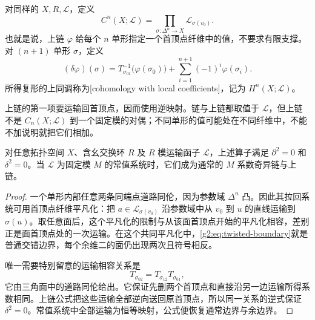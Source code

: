 \begin{definition}[局部系数奇异上链]\label{g2:def:twisted-cochains}
	对同样的 \(X,R,\mathcal L\)，定义
	\[
		C^n(X;\mathcal L)=\prod_{\sigma:\Delta^n\to X}\mathcal L_{\sigma(v_0)}.
	\]
	也就是说，上链 \(\varphi\) 给每个 \(n\) 单形指定一个首顶点纤维中的值，不要求有限支撑。对 \((n+1)\) 单形 \(\sigma\)，定义
	\begin{equation}\label{g2:eq:twisted-coboundary}
		(\delta\varphi)(\sigma)=T_{\sigma_{01}}^{-1}\bigl(\varphi(\sigma_0)\bigr)+\sum_{i=1}^{n+1}(-1)^i\varphi(\sigma_i).
	\end{equation}
	所得复形的上同调称为[cohomology with local coefficients]，记为 \(H^n(X;\mathcal L)\)。
\end{definition}

上链的第一项要运输回首顶点，因而使用逆映射。链与上链都取值于 \(\mathcal L\)，但上链不是 \(C_n(X;\mathcal L)\) 到一个固定模的对偶；不同单形的值可能处在不同纤维中，不能不加说明就把它们相加。

\begin{proposition}\label{g2:prop:twisted-boundary-square}
	对任意拓扑空间 \(X\)、含幺交换环 \(R\) 及 \(R\) 模运输函子 \(\mathcal L\)，上述算子满足 \(\partial^2=0\) 和 \(\delta^2=0\)。当 \(\mathcal L\) 为固定模 \(M\) 的常值系统时，它们成为通常的 \(M\) 系数奇异链与上链。
\end{proposition}
\begin{proof}
	一个单形内部任意两条同端点道路同伦，因为参数域 \(\Delta^n\) 凸。因此其拉回系统可用首顶点纤维平凡化：把 \(a\in\mathcal L_{\sigma(v_0)}\) 沿参数域中从 \(v_0\) 到 \(u\) 的直线运输到 \(\sigma(u)\)。取任意面后，这个平凡化的限制与从该面首顶点开始的平凡化相容，差别正是面首顶点处的一次运输。在这个共同平凡化中，\eqref{g2:eq:twisted-boundary}就是普通交错边界，每个余维二的面仍出现两次且符号相反。

	唯一需要特别留意的运输相容关系是
	\[
		T_{\sigma_{02}}=T_{\sigma_{12}}T_{\sigma_{01}},
	\]
	它由三角面中的道路同伦给出。它保证先删两个首顶点和直接沿另一边运输所得系数相同。上链公式把这些运输全部逆向送回原首顶点，所以同一关系的逆式保证 \(\delta^2=0\)。常值系统中全部运输为恒等映射，公式便恢复通常边界与余边界。
\end{proof}

